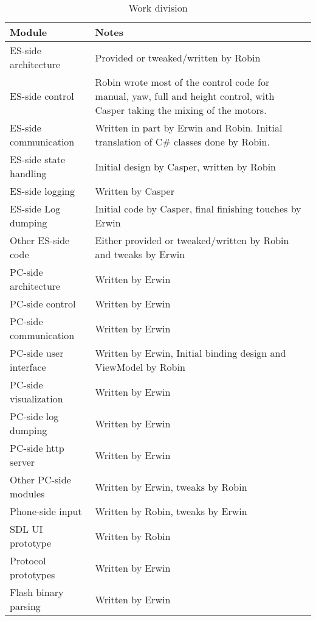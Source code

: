 \documentclass[final]{article}
\begin{document}
\begin{table}[H]
    \caption{Work division}
    \label{tab:work-division}
    \centering
    \begin{tabular}{lp{12cm}}
    \toprule
    Module                   & Notes \\
    \midrule
    ES-side architecture & Provided or tweaked/written by Robin \\
    ES-side control & Robin wrote most of the control code for manual, yaw, full and height control, with Casper taking the mixing of the motors. \\
    ES-side communication & Written in part by Erwin and Robin. Initial translation of C\# classes done by Robin.\\
    ES-side state handling & Initial design by Casper, written by Robin \\
    ES-side logging & Written by Casper \\
    ES-side Log dumping & Initial code by Casper, final finishing touches by Erwin \\
    Other ES-side code & Either provided or tweaked/written by Robin and tweaks by Erwin \\
    \midrule
    PC-side architecture & Written by Erwin \\
    PC-side control & Written by Erwin \\
    PC-side communication & Written by Erwin \\
    PC-side user interface & Written by Erwin, Initial binding design and ViewModel by Robin \\
    PC-side visualization & Written by Erwin \\
    PC-side log dumping & Written by Erwin \\
    PC-side http server & Written by Erwin \\
    Other PC-side modules & Written by Erwin, tweaks by Robin \\
    \midrule
    Phone-side input & Written by Robin, tweaks by Erwin \\
    SDL UI prototype & Written by Robin \\
    Protocol prototypes & Written by Erwin \\
    Flash binary parsing & Written by Erwin \\
    \bottomrule
    \end{tabular}
\end{table}
\end{document}
